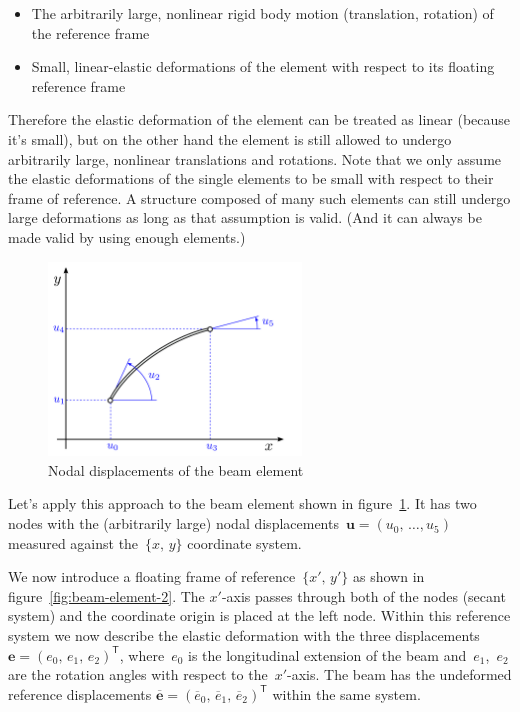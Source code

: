 \begin{itemize}
\item The arbitrarily large, nonlinear rigid body motion (translation, rotation) of the reference frame
\item Small, linear-elastic deformations of the element with respect to its floating reference frame
\end{itemize}

Therefore the elastic deformation of the element can be treated as linear (because it's small), but on the other hand the element is still allowed to undergo arbitrarily large, nonlinear translations and rotations.
Note that we only assume the elastic deformations of the single elements to be small with respect to their frame of reference.
A structure composed of many such elements can still undergo large deformations as long as that assumption is valid. (And it can always be made valid by using enough elements.)

\begin{figure}[h]
\centering
\includegraphics[width=0.6\textwidth]{figures/elements/beam-element-1}
\caption{Nodal displacements of the beam element}
\label{fig:beam-element-1}
\end{figure}

Let's apply this approach to the beam element shown in figure~\ref{fig:beam-element-1}. It has two nodes with the (arbitrarily large) nodal displacements~$\boldsymbol{u} = (u_0,\,\ldots,u_5)$ measured against the~$\{x,\,y\}$ coordinate system.

We now introduce a floating frame of reference~$\{x',\,y'\}$ as shown in figure~\ref{fig:beam-element-2}. The $x'$-axis passes through both of the nodes (secant system) and the coordinate origin is placed at the left node. Within this reference system we now describe the elastic deformation with the three displacements~$\boldsymbol{e} = (e_0,\,e_1,\,e_2)^\mathsf{T}$, where~$e_0$ is the longitudinal extension of the beam and~$e_1$,~$e_2$ are the rotation angles with respect to the~$x'$-axis. The beam has the undeformed reference displacements $\overline{\boldsymbol{e}} = (\overline{e}_0,\,\overline{e}_1,\,\overline{e}_2)^\mathsf{T}$ within the same system.

